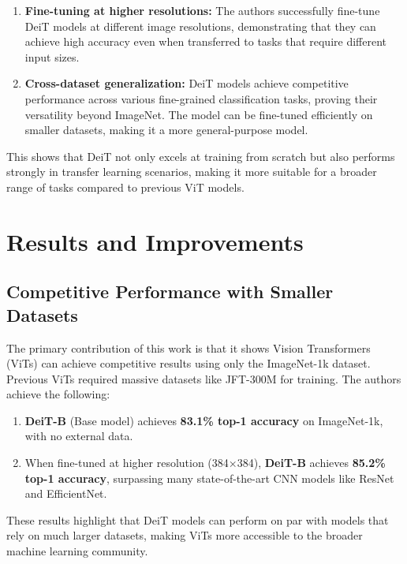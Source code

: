 \documentclass{report}
\begin{document}
	\begin{enumerate}
		\item 
		\textbf{Fine-tuning at higher resolutions:} The authors successfully fine-tune DeiT models at different image resolutions, demonstrating that they can achieve high accuracy even when transferred to tasks that require different input sizes.
		
		\item 
		\textbf{Cross-dataset generalization:} DeiT models achieve competitive performance across various fine-grained classification tasks, proving their versatility beyond ImageNet. The model can be fine-tuned efficiently on smaller datasets, making it a more general-purpose model.
	\end{enumerate}
	This shows that DeiT not only excels at training from scratch but also performs strongly in transfer learning scenarios, making it more suitable for a broader range of tasks compared to previous ViT models.
	
	
	
	
	
	
	\section{Results and Improvements}
	\subsection{Competitive Performance with Smaller Datasets}
	The primary contribution of this work is that it shows Vision Transformers (ViTs) can achieve competitive results using only the ImageNet-1k dataset. Previous ViTs required massive datasets like JFT-300M for training. The authors achieve the following:
	\begin{enumerate}
		\item 
		\textbf{DeiT-B} (Base model) achieves \textbf{83.1\% top-1 accuracy} on ImageNet-1k, with no external data.
		
		\item 
		When fine-tuned at higher resolution (384×384), \textbf{DeiT-B} achieves \textbf{85.2\% top-1 accuracy}, surpassing many state-of-the-art CNN models like ResNet and EfficientNet.
	\end{enumerate}
	
	These results highlight that DeiT models can perform on par with models that rely on much larger datasets, making ViTs more accessible to the broader machine learning community.
	
	
\end{document}
